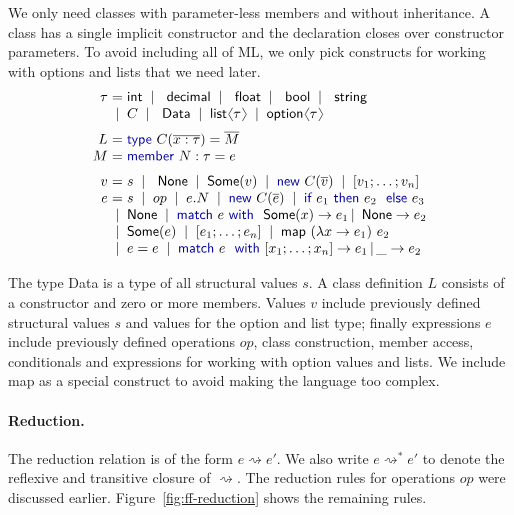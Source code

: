 \documentclass[10pt,preprint,blind,clearpagebib]{sigplanconf}
\newcommand{\langl}{\begin{picture}(4.5,7)
\put(1.1,2.5){\rotatebox{60}{\line(1,0){5.5}}}
\put(1.1,2.5){\rotatebox{300}{\line(1,0){5.5}}}
\end{picture}}
\newcommand{\rangl}{\begin{picture}(4.5,7)
\put(.9,2.5){\rotatebox{120}{\line(1,0){5.5}}}
\put(.9,2.5){\rotatebox{240}{\line(1,0){5.5}}}
\end{picture}}
\newcommand{\kvd}[1]{\textnormal{\textcolor{kvdclr}{\sffamily #1}}}
\newcommand{\ident}[1]{\textnormal{\sffamily #1}}
\newcommand{\lsep}[0]{\;\; | \;\;}
\newcommand{\narrow}[1]{\hspace{-0.7em} #1 \hspace{-0.7em}}
\newcommand{\reduce}{\rightsquigarrow}
\begin{document}
We only need classes with parameter-less members and without inheritance. A class has a single 
implicit constructor and the declaration closes over constructor parameters. To avoid including all 
of ML, we only pick constructs for working with options and lists that we need later.
%
\begin{equation*}
\begin{array}{rcl}
 \tau &\narrow{=}& \ident{int} \lsep \ident{decimal} \lsep \ident{float} \lsep \ident{bool} \lsep \ident{string} \\[0.0em]
      &\narrow{|}& C \lsep \ident{Data} \lsep \ident{list}\langl\tau\rangl \lsep \ident{option}\langl\tau\rangl \\[0.6em]
 L &\narrow{=}& \kvd{type}~C(\overline{x:\tau}) = \overline{M} \\[0.0em]
 M &\narrow{=}& \kvd{member}~N:\tau=e \\[0.6em]
 v &\narrow{=}& s \lsep \ident{None} \lsep \ident{Some}(v) \lsep \kvd{new}~C(\overline{v}) \lsep [v_1; \ldots; v_n] \\[0.0em]
 e &\narrow{=}& s \lsep op \lsep e.N \lsep \kvd{new}~C(\overline{e}) \lsep {\kvd{if}~e_1~\kvd{then}~e_2~\kvd{else}~e_3}\\
   &\narrow{|}& \ident{None} \lsep\kvd{match}~e~\kvd{with}~\ident{Some}(x) \rightarrow e_1 \,|\, \ident{None} \rightarrow e_2 \\
   &\narrow{|}& \ident{Some}(e) \lsep [e_1;\ldots;e_n]\lsep \ident{map}~(\lambda x\rightarrow e_1)~e_2\\
   &\narrow{|}& e = e \lsep \kvd{match}~e~\kvd{with}~[x_1; \ldots; x_n] \rightarrow e_1 \,|\, \_ \rightarrow e_2
\end{array}
\end{equation*}

\noindent
The type \ident{Data} is a type of all structural values $s$. A class
definition $L$ consists of a constructor and zero or more members. Values $v$ include 
previously defined structural values $s$ and values for the option and list type; finally 
expressions $e$ include previously defined operations $op$, class construction, member access, 
conditionals and expressions for working with option values and lists. We include 
\ident{map} as a special construct to avoid making the language too complex.

\paragraph{Reduction.}
The reduction relation is of the form $e \reduce e'$. We also write 
$e \reduce^{*} e'$ to denote the reflexive and transitive closure of $\reduce$. The reduction rules
for operations $op$ were discussed earlier. Figure~\ref{fig:ff-reduction} shows the remaining
rules.
\end{document}
